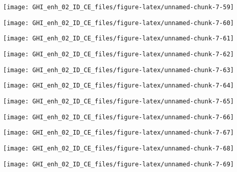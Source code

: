 \documentclass[
  10pt,
  a4paper,oneside]{article}
\begin{document}
\begin{center}\texttt{[image: GHI\_enh\_02\_ID\_CE\_files/figure-latex/unnamed-chunk-7-59]} \end{center}

\begin{center}\texttt{[image: GHI\_enh\_02\_ID\_CE\_files/figure-latex/unnamed-chunk-7-60]} \end{center}

\begin{center}\texttt{[image: GHI\_enh\_02\_ID\_CE\_files/figure-latex/unnamed-chunk-7-61]} \end{center}

\begin{center}\texttt{[image: GHI\_enh\_02\_ID\_CE\_files/figure-latex/unnamed-chunk-7-62]} \end{center}

\begin{center}\texttt{[image: GHI\_enh\_02\_ID\_CE\_files/figure-latex/unnamed-chunk-7-63]} \end{center}

\begin{center}\texttt{[image: GHI\_enh\_02\_ID\_CE\_files/figure-latex/unnamed-chunk-7-64]} \end{center}

\begin{center}\texttt{[image: GHI\_enh\_02\_ID\_CE\_files/figure-latex/unnamed-chunk-7-65]} \end{center}

\begin{center}\texttt{[image: GHI\_enh\_02\_ID\_CE\_files/figure-latex/unnamed-chunk-7-66]} \end{center}

\begin{center}\texttt{[image: GHI\_enh\_02\_ID\_CE\_files/figure-latex/unnamed-chunk-7-67]} \end{center}

\begin{center}\texttt{[image: GHI\_enh\_02\_ID\_CE\_files/figure-latex/unnamed-chunk-7-68]} \end{center}

\begin{center}\texttt{[image: GHI\_enh\_02\_ID\_CE\_files/figure-latex/unnamed-chunk-7-69]} \end{center}
\end{document}
